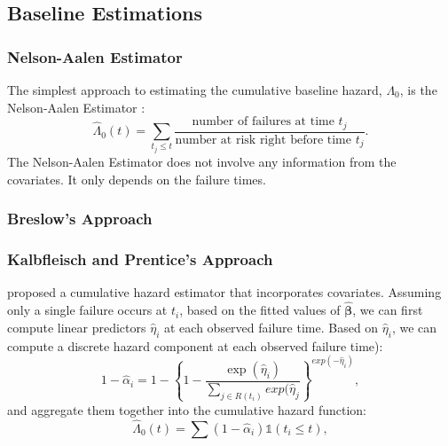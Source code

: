 \documentclass{article}
\newcommand{\bbeta}{\boldsymbol{\beta}}
\begin{document}
\subsection{Baseline Estimations}

	\subsubsection{Nelson-Aalen Estimator}
	 The simplest approach to estimating the cumulative baseline hazard, $\Lambda_0$, is the Nelson-Aalen Estimator \citep{nelson1969, aalen1978}:
\begin{equation}
  \hat{\Lambda}_{0}(t) = \sum_{t_j \leq t}\frac{\text{number of failures at time } t_j}{\text{number at risk right before time }t_j}.
\end{equation}
	The Nelson-Aalen Estimator does not involve any information from the covariates. It only depends on the failure times.

	\subsubsection{Breslow's Approach}	

	\subsubsection{Kalbfleisch and Prentice's Approach}					
	\cite{Kalbfleisch2011} proposed a cumulative hazard estimator that incorporates covariates. Assuming only a single failure occurs at $t_i$, based on the fitted values of $\hat{\bbeta}$, we can first compute linear predictors $\hat{\eta}_i$ at each observed failure time. Based on $\hat{\eta}_i$, we can compute a discrete hazard component at each observed failure time):
\begin{equation}
1 - \hat{\alpha}_{i} = 1 - \left\{ 1 - \frac{\exp (\hat{\eta}_{i})}{\sum_{ j \in R(t_{i})}exp (\hat{\eta}_{j}} \right\}^{exp(-\hat{\eta}_{i})},
\end{equation}
and aggregate them together into the cumulative hazard function:
\begin{equation} 
\hat{\Lambda}_0(t) = \sum(1 - \hat{\alpha}_i)\mathds{1}(t_{i} \leq t),
\end{equation}
\end{document}
